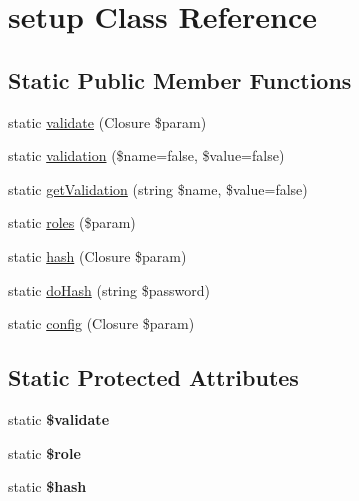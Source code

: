 \hypertarget{classcommon_1_1user_1_1setup}{\section{setup \-Class \-Reference}
\label{classcommon_1_1user_1_1setup}
}
\subsection*{\-Static \-Public \-Member \-Functions}
\begin{DoxyCompactItemize}
\item 
static \hyperlink{classcommon_1_1user_1_1setup_aa314bea9f4df81cbd2cb155678082912}{validate} (\-Closure \$param)
\item 
static \hyperlink{classcommon_1_1user_1_1setup_a0d63aec80fb945ee3a1f6043e2156051}{validation} (\$name=false, \$value=false)
\item 
static \hyperlink{classcommon_1_1user_1_1setup_a1f7f0422f10a5b412cc661235b0fda2f}{get\-Validation} (string \$name, \$value=false)
\item 
static \hyperlink{classcommon_1_1user_1_1setup_a716abcfa0c82470936af05770e097fb4}{roles} (\$param)
\item 
static \hyperlink{classcommon_1_1user_1_1setup_a7e6401bd44979a11d91987321a39be9f}{hash} (\-Closure \$param)
\item 
static \hyperlink{classcommon_1_1user_1_1setup_a192e5e42e0507d342adb1141524723d7}{do\-Hash} (string \$password)
\item 
static \hyperlink{classcommon_1_1user_1_1setup_a8a811c28ecf188643b22c3f7316855cb}{config} (\-Closure \$param)
\end{DoxyCompactItemize}
\subsection*{\-Static \-Protected \-Attributes}
\begin{DoxyCompactItemize}
\item 
\hypertarget{classcommon_1_1user_1_1setup_a320b75b46e1832c327d9d47b4cea9e7d}{static {\bfseries \$validate}}\label{classcommon_1_1user_1_1setup_a320b75b46e1832c327d9d47b4cea9e7d}

\item 
\hypertarget{classcommon_1_1user_1_1setup_a1ea903cca285c7c0b4c9203932100309}{static {\bfseries \$role}}\label{classcommon_1_1user_1_1setup_a1ea903cca285c7c0b4c9203932100309}

\item 
\hypertarget{classcommon_1_1user_1_1setup_ac9fdf6f2c8fb45c1d3bb9a176802b2ad}{static {\bfseries \$hash}}\label{classcommon_1_1user_1_1setup_ac9fdf6f2c8fb45c1d3bb9a176802b2ad}

\end{DoxyCompactItemize}



